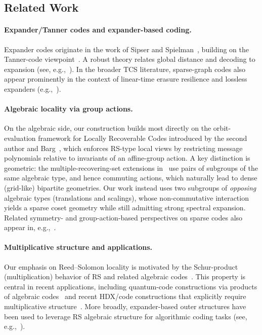 \documentclass[11pt]{article}
\theoremstyle{plain}
\theoremstyle{definition}
\begin{document}
\subsection{Related Work}
\paragraph{Expander/Tanner codes and expander-based coding.}
Expander codes originate in the work of Sipser and Spielman~\cite{SipserSp96}, building on the Tanner-code viewpoint~\cite{tanner1981recursive}.
A robust theory relates global distance and decoding to expansion (see, e.g.,~\cite{hlw2006expander,zemore-expander-decoding,barg2006distance}).
In the broader TCS literature, sparse-graph codes also appear prominently in the context of linear-time erasure resilience and lossless expanders (e.g.,~\cite{AlonEdmondsLuby95,AlonLuby96,CapalboReingoldVadhanWigderson02}).

\paragraph{Algebraic locality via group actions.}
On the algebraic side, our construction builds most directly on the orbit-evaluation framework for Locally Recoverable Codes introduced by the second author  and Barg~\cite{tamo2014family}, which enforces RS-type local views by restricting message polynomials relative to invariants of an affine-group action.
A key distinction is geometric: the multiple-recovering-set extensions in~\cite{tamo2014family} use pairs of subgroups of the same algebraic type, and hence commuting actions, which naturally lead to dense (grid-like) bipartite geometries.
Our work instead uses two subgroups of \emph{opposing} algebraic types (translations and scalings), whose non-commutative interaction yields a sparse coset geometry while still admitting strong spectral expansion.
Related symmetry- and group-action-based perspectives on sparse codes also appear in, e.g.,~\cite{kaufman-lubotzky}.

\paragraph{Multiplicative structure and applications.}
Our emphasis on Reed--Solomon locality is motivated by the Schur-product (multiplication) behavior of RS and related algebraic codes~\cite{randriambololona2015products}.
This property is central in recent applications, including quantum-code constructions via products of algebraic codes~\cite{golowich2024quantum} and recent HDX/code constructions that explicitly require multiplicative structure~\cite{dinur2023new}.
More broadly, expander-based outer structures have been used to leverage RS algebraic structure for algorithmic coding tasks (see, e.g.,~\cite{GuruswamiRudra05}).
\end{document}
